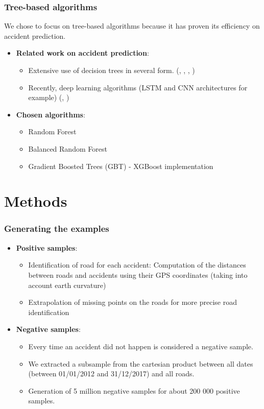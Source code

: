 \documentclass[slidestop,compress,red,mathserif]{beamer}
\begin{document}
\begin{frame}
\frametitle{Tree-based algorithms}
We chose to focus on tree-based algorithms because it has proven its efficiency on accident prediction.
\begin{itemize}
\item[] \textbf{Related work on accident prediction}:
  \begin{itemize}
    \item Extensive use of decision trees in several form. (\cite{Theofilatos2017}, \cite{Abellan2013}, \cite{Lin2015}, \cite{Chang2005})
    \item Recently, deep learning algorithms (LSTM and CNN architectures for example) (\cite{Yuan2018}, \cite{Chen2016})
  \end{itemize}
\item[] \textbf{Chosen algorithms}:
  \begin{itemize}
  	\item Random Forest
    \item Balanced Random Forest
    \item Gradient Boosted Trees (GBT) - XGBoost implementation
  \end{itemize}
\end{itemize}
\end{frame}


\section{Methods}

\begin{frame}
	\frametitle{Generating the examples}
  \begin{itemize}
  \item[] \textbf{Positive samples}:
    \begin{itemize}
      \item Identification of road for each accident: Computation of the distances between roads and accidents using their GPS coordinates (taking into account earth curvature)
		  \item Extrapolation of missing points on the roads for more precise road identification
    \end{itemize}
  \item[] \textbf{Negative samples}:
    \begin{itemize}
      \item Every time an accident did not happen is considered a negative sample.
  		\item We extracted a subsample from the cartesian product between all dates (between 01/01/2012 and 31/12/2017) and all roads.
  		\item Generation of 5 million negative samples for about 200 000 positive samples.
    \end{itemize}

	\end{itemize}
\end{frame}
\end{document}
